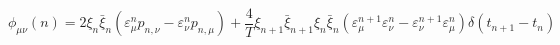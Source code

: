 \begin{equation}
\phi _{\mu \nu } (n) = 2\xi _n \bar \xi _n  (\varepsilon _\mu ^n p_{n,\nu }  - 
\varepsilon _\nu ^n p_{n,\mu } ) + \frac{4}{T}\xi _{n + 1} \bar \xi _{n + 1}  
\xi _n \bar \xi _n (\varepsilon _\mu ^{n + 1} \varepsilon _\nu ^n  - 
\varepsilon _\nu ^{n + 1} \varepsilon _\mu ^n )\delta (t_{n + 1}  - t_n )
\end{equation}

